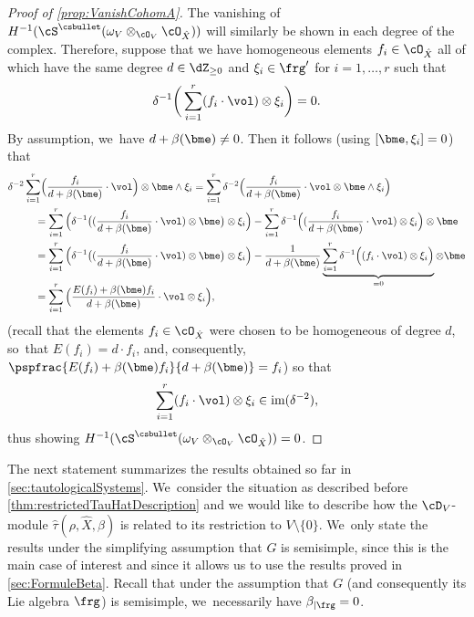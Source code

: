 \begin{proof}[Proof of \cref{prop:VanishCohomA}]
The vanishing of $H^{-1}(\cS^{\csbullet}(\omega_V\otimes_{\cO_V} \cO_{\hat{X}}))$ will similarly be shown in each degree of the complex. Therefore, suppose that we have homogeneous elements $f_i\in\cO_{\hat{X}}$ all of which have the same degree $d\in\dZ_{\geq 0}$ and $\xi_i\in \frg'$ for $i=1,\ldots,r$ such that
\[
\delta^{-1}\bigg(
\sum_{i=1}^r (f_i\cdot \vol)\otimes \xi_i\bigg)=0.
\]
By assumption, we~have $d+\beta(\bme)\neq 0$. Then it follows (using $[\bme, \xi_i]=0$) that
\begin{align*}
\delta^{-2}\sum_{i=1}^r&
\Bigl(\frac{f_i}{d+\beta(\bme)}\cdot\vol \Bigr)\otimes \bme\wedge \xi_i=
\sum_{i=1}^r
\delta^{-2}\Big(
\frac{f_i}{d+\beta(\bme)}\cdot\vol\otimes \bme\wedge \xi_i\Big)\\
&\hspace*{-2mm}=
\sum_{i=1}^r\Big(\delta^{-1}\big((\frac{f_i}{d+\beta(\bme)}\cdot\vol)\otimes \bme\big)\otimes \xi_i\Big) -
\sum_{i=1}^r\delta^{-1}\Big((\frac{f_i}{d+\beta(\bme)}\cdot\vol)\otimes \xi_i\Big)\otimes \bme
\\
&\hspace*{-2mm}=
\sum_{i=1}^r\Big(\delta^{-1}\big((\frac{f_i}{d+\beta(\bme)}\cdot\vol)\otimes \bme\big)\otimes \xi_i\Big)
-\frac{1}{d+\beta(\bme)}
\underbrace{\sum_{i=1}^r\delta^{-1}\Big((f_i\cdot\vol)\otimes \xi_i\Big)}_{=0}\otimes \bme
\\[-8pt]
&\hspace*{-2mm}=
\sum_{i=1}^r \Big(\frac{E(f_i)+\beta(\bme)f_i}{d+\beta(\bme)}\cdot \vol\otimes \xi_i
\Big),
\end{align*}
(recall that the elements $f_i\in \cO_{\hat{X}}$ were chosen to be homogeneous of degree $d$, so~that $E(f_i)=d\cdot f_i$, and, consequently, $\pspfrac{E(f_i)+\beta(\bme)f_i}{d+\beta(\bme)}=f_i$) so that
\[
\sum_{i=1}^r (f_i\cdot \vol)\otimes \xi_i\in\textup{im}(\delta^{-2}),
\]
thus showing $H^{-1}(\cS^{\csbullet}(\omega_V\otimes_{\cO_V}\cO_{\hat{X}}))=0$.
\end{proof}

The next statement summarizes the results obtained so far in \cref{sec:tautologicalSystems}. We~consider the situation as described before \cref{thm:restrictedTauHatDescription} and we would like to describe how the $\cD_V$\nobreakdash-mod\-ule $\hat{\tau}(\rho, \hat{X},\beta)$ is related to its restriction to $V\setminus\{0\}$. We~only state the results under the simplifying assumption that $G$ is semisimple, since this is the main case of interest and since it allows us to use the results proved in \cref{sec:FormuleBeta}.
Recall that under the assumption that $G$ (and consequently its Lie algebra $\frg$) is semisimple, we~necessarily have $\beta_{|\frg} = 0$.

